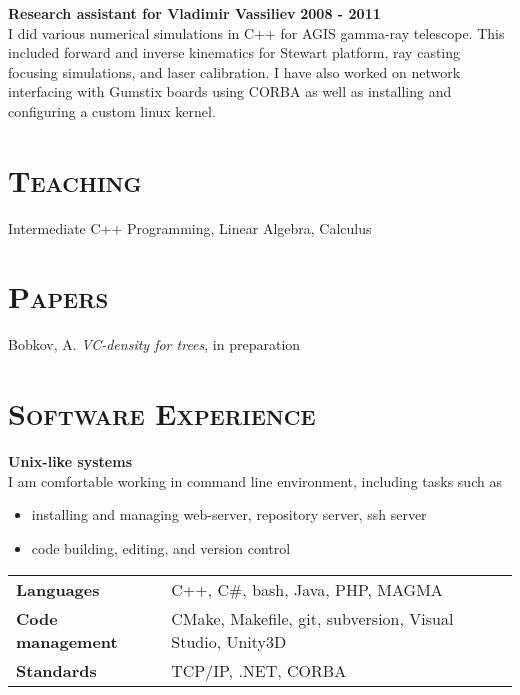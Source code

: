 \documentclass[margin, 10pt]{res} %
\begin{document}
\begin{resume}
\textbf{Research assistant for Vladimir Vassiliev} \hfill \textbf{2008 - 2011}\\
I did various numerical simulations in C++ for AGIS gamma-ray telescope. This included forward and inverse kinematics for Stewart platform, ray casting focusing simulations, and laser calibration. I have also worked on network interfacing with Gumstix boards using CORBA as well as installing and configuring a custom linux kernel. 

 
\section{\textsc{Teaching}}

Intermediate C++ Programming, Linear Algebra, Calculus

 
\section{\textsc{Papers}}

Bobkov, A. {\it VC-density for trees}, in preparation


 
\section{\textsc{Software Experience}}

\textbf{Unix-like systems}\\
I am comfortable working in command line environment, including tasks such as
\begin{itemize}
	\item installing and managing web-server, repository server, ssh server
	\item code building, editing, and version control
\end{itemize}

\begin{tabular}{ll}
\textbf{Languages} & C++, C\#, bash, Java, PHP, MAGMA \\
\textbf{Code management} & CMake, Makefile, git, subversion, Visual Studio, Unity3D \\
\textbf{Standards} & TCP/IP, .NET, CORBA  \\
\end{tabular}


\end{resume}
\end{document}
